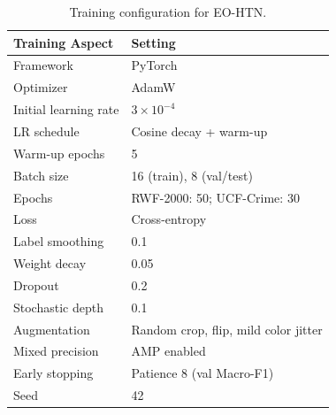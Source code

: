 \documentclass[AMA,Times1COL]{WileyNJDv5} %
\begin{document}
\begin{table}[t]
\centering
\caption{Training configuration for EO-HTN.}
\label{tab:train_config_eohtn}
\renewcommand{\arraystretch}{1.1}
\setlength{\tabcolsep}{3.5pt}
\begin{tabular}{|p{3.6cm}|p{5.6cm}|}
\hline
\textbf{Training Aspect} & \textbf{Setting} \\
\hline
Framework & PyTorch \\
\hline
Optimizer & AdamW \\
\hline
Initial learning rate & $3 \times 10^{-4}$ \\
\hline
LR schedule & Cosine decay + warm-up \\
\hline
Warm-up epochs & 5 \\
\hline
Batch size & 16 (train), 8 (val/test) \\
\hline
Epochs & RWF-2000: 50; UCF-Crime: 30 \\
\hline
Loss & Cross-entropy \\
\hline
Label smoothing & 0.1 \\
\hline
Weight decay & 0.05 \\
\hline
Dropout & 0.2 \\
\hline
Stochastic depth & 0.1 \\
\hline
Augmentation & Random crop, flip, mild color jitter \\
\hline
Mixed precision & AMP enabled \\
\hline
Early stopping & Patience 8 (val Macro-F1) \\
\hline
Seed & 42 \\
\hline
\end{tabular}%
\end{table}
\end{document}
